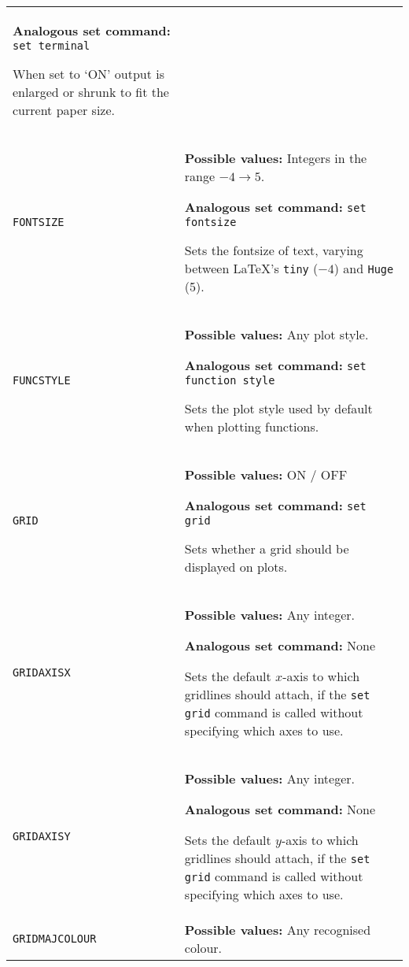 \documentclass[a4paper,onecolumn,11pt]{book}
\begin{document}
\begin{longtable}{p{3.4cm}p{9cm}}
                   \textbf{Analogous set command:} \texttt{set terminal}\index{set terminal command@\texttt{set terminal} command}
                   
                   When set to `ON' output is enlarged or shrunk to fit the
                   current paper size.
                   \\

\texttt{FONTSIZE} & \textbf{Possible values:} Integers in the range $-4 \to 5$.

                   \textbf{Analogous set command:} \texttt{set fontsize}\index{set fontsize command@\texttt{set fontsize} command}

                   Sets the fontsize of text, varying between \LaTeX's \texttt{tiny} ($-4$) and \texttt{Huge} (5).
                   \\
\texttt{FUNCSTYLE} & \textbf{Possible values:} Any plot style.

                   \textbf{Analogous set command:} \texttt{set function style}\index{set function style command@\texttt{set function style} command}

                   Sets the plot style used by default when plotting functions.
                   \\
\texttt{GRID} & \textbf{Possible values:} ON / OFF

                   \textbf{Analogous set command:} \texttt{set grid}\index{set grid command@\texttt{set grid} command}

                   Sets whether a grid should be displayed on plots.
                   \\
\texttt{GRIDAXISX} & \textbf{Possible values:} Any integer.

                   \textbf{Analogous set command:} None

                   Sets the default $x$-axis to which gridlines should attach, if the \texttt{set grid} command is called without specifying which axes to use.
                   \\
\texttt{GRIDAXISY} & \textbf{Possible values:} Any integer.

                   \textbf{Analogous set command:} None

                   Sets the default $y$-axis to which gridlines should attach, if the \texttt{set grid} command is called without specifying which axes to use.
                   \\
\texttt{GRIDMAJCOLOUR} & \textbf{Possible values:} Any recognised colour.


\end{longtable}
\end{document}
